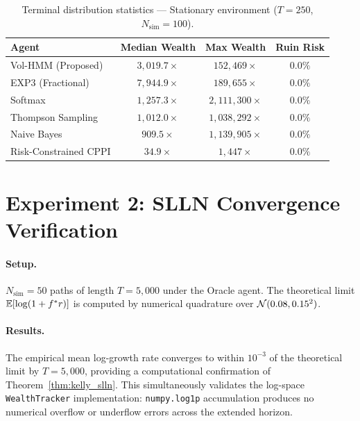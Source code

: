 \begin{table}[h]
\centering
\caption{Terminal distribution statistics --- Stationary environment
($T=250$, $N_{\text{sim}}=100$).}
\label{tab:stationary_stats}
\renewcommand{\arraystretch}{1.2}
\begin{tabular}{lccc}
\toprule
\textbf{Agent} & \textbf{Median Wealth} & \textbf{Max Wealth} & \textbf{Ruin Risk} \\
\midrule
Vol-HMM (Proposed)     & $3{,}019.7\times$ & $152{,}469\times$ & $0.0\%$ \\
EXP3 (Fractional)      & $7{,}944.9\times$ & $189{,}655\times$ & $0.0\%$ \\
Softmax                & $1{,}257.3\times$ & $2{,}111{,}300\times$ & $0.0\%$ \\
Thompson Sampling      & $1{,}012.0\times$ & $1{,}038{,}292\times$ & $0.0\%$ \\
Naive Bayes            &   $909.5\times$   & $1{,}139{,}905\times$ & $0.0\%$ \\
Risk-Constrained CPPI  &    $34.9\times$   &     $1{,}447\times$   & $0.0\%$ \\
\bottomrule
\end{tabular}
\end{table}

\section{Experiment 2: SLLN Convergence Verification}
\label{sec:exp2}

\paragraph{Setup.}
$N_{\text{sim}}=50$ paths of length $T=5{,}000$ under the Oracle agent.
The theoretical limit $\mathbb{E}[\log(1+f^*r)]$ is computed by numerical quadrature
over $\mathcal{N}(0.08,0.15^2)$.

\paragraph{Results.}
The empirical mean log-growth rate converges to within $10^{-3}$ of the
theoretical limit by $T=5{,}000$, providing a computational confirmation of
Theorem~\ref{thm:kelly_slln}.  This simultaneously validates the log-space
\texttt{WealthTracker} implementation: \texttt{numpy.log1p} accumulation
produces no numerical overflow or underflow errors across the extended horizon.

